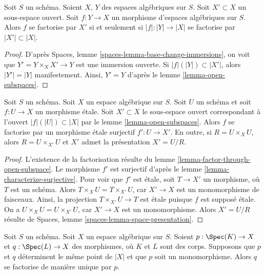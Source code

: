 \begin{lemma}
\label{lemma-factor-through-open-subspace}
Soit $S$ un schéma.
Soient $X$, $Y$ des espaces algébriques sur $S$.
Soit $X' \subset X$ un sous-espace ouvert.
Soit $f : Y \to X$ un morphisme d'espaces algébriques sur $S$.
Alors $f$ se factorise par $X'$ si et seulement si $|f| : |Y| \to |X|$
se factorise par $|X'| \subset |X|$.
\end{lemma}

\begin{proof}
D'après Spaces, lemme \ref{spaces-lemma-base-change-immersions},
on voit que $Y' = Y \times_X X' \to Y$ est une immersion ouverte.
Si $|f|(|Y|) \subset |X'|$, alors $|Y'| = |Y|$ manifestement. Ainsi, $Y' = Y$ d'après le
lemme \ref{lemma-open-subspaces}.
\end{proof}

\begin{lemma}
\label{lemma-etale-image-open}
Soit $S$ un schéma. Soit $X$ un espace algébrique sur $S$.
Soit $U$ un schéma et soit $f : U \to X$ un morphisme étale.
Soit $X' \subset X$ le sous-espace ouvert correspondant à
l'ouvert $|f|(|U|) \subset |X|$ par le
lemme \ref{lemma-open-subspaces}.
Alors $f$ se factorise par un morphisme étale surjectif $f' : U \to X'$.
En outre, si $R = U \times_X U$, alors $R = U \times_{X'} U$ et $X'$ admet
la présentation $X' = U/R$.
\end{lemma}

\begin{proof}
L'existence de la factorisation résulte du
lemme \ref{lemma-factor-through-open-subspace}.
Le morphisme $f'$ est surjectif d'après le
lemme \ref{lemma-characterize-surjective}.
Pour voir que $f'$ est étale, soit $T \to X'$ un morphisme,
où $T$ est un schéma. Alors $T \times_X U = T \times_{X'} U$,
car $X' \to X$ est un monomorphisme de faisceaux. Ainsi, la projection
$T \times_{X'} U \to T$ est étale puisque $f$ est supposé étale.
On a $U \times_X U = U \times_{X'} U$, car $X' \to X$ est un monomorphisme.
Alors $X' = U/R$ résulte de
Spaces, lemme \ref{spaces-lemma-space-presentation}.
\end{proof}

\begin{lemma}
\label{lemma-equivalence-class-point-monomorphism}
Soit $S$ un schéma. Soit $X$ un espace algébrique sur $S$.
Soient $p : \Spec(K) \to X$ et $q : \Spec(L) \to X$
des morphismes, où $K$ et $L$ sont des corps. Supposons que $p$ et $q$
déterminent le même point de $|X|$ et que $p$ soit un monomorphisme.
Alors $q$ se factorise de manière unique par $p$.
\end{lemma}

